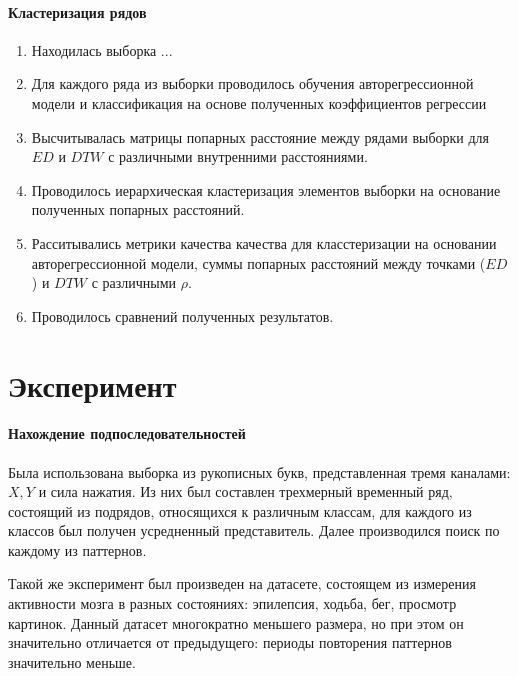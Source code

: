 \documentclass[12pt,twoside]{article}
\begin{document}
        \paragraph{Кластеризация рядов}
        \begin{enumerate}[label=\arabic*)]
            \item Находилась выборка ... 
            \item Для каждого ряда из выборки проводилось обучения авторегрессионной модели и классификация на основе полученных коэффициентов регрессии
            \item Высчитывалась матрицы попарных расстояние между рядами выборки для $ED$ и $DTW$ с различными внутренними расстояниями.
            \item Проводилось иерархическая кластеризация элементов выборки на основание полученных попарных расстояний.
            \item Расситывались метрики качества качества для класстеризации на основании авторегрессионной модели,
                суммы попарных расстояний между точками ($ED$) и $DTW$ с различными $\rho$.
            \item Проводилось сравнений полученных результатов. 
        \end{enumerate}
									
    \section{Эксперимент}

        \paragraph{Нахождение подпоследовательностей}
        Была использована выборка из рукописных букв, представленная тремя каналами: $X, Y$ и сила нажатия.
        Из них был составлен трехмерный временный ряд, состоящий из подрядов, относящихся к различным классам,
            для каждого из классов был получен усредненный представитель.
        Далее производился поиск по каждому из паттернов.

        Такой же эксперимент был произведен на датасете, состоящем из измерения активности мозга в разных состояниях:
            эпилепсия, ходьба, бег, просмотр картинок.
        Данный датасет многократно меньшего размера, но при этом он значительно отличается от предыдущего:
            периоды повторения паттернов значительно меньше.
        
\end{document}

